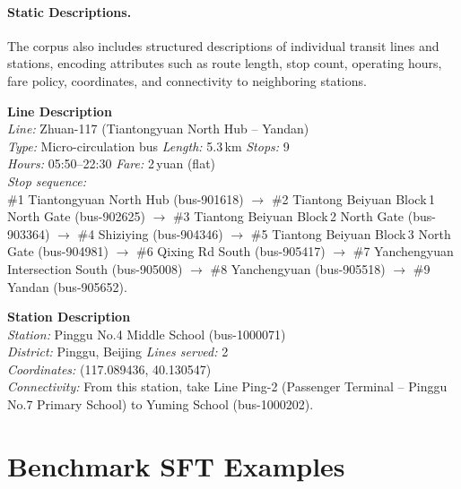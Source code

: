 \documentclass{llmxive}
\begin{document}
\paragraph{Static Descriptions.}
The corpus also includes structured descriptions of individual transit lines and stations, encoding attributes such as route length, stop count, operating hours, fare policy, coordinates, and connectivity to neighboring stations.

\begin{tcolorbox}[colback=gray!3, colframe=black!40, boxrule=0.4pt, arc=2pt, left=6pt, right=6pt, top=4pt, bottom=4pt, fontupper=\small, fontlower=\small, breakable, title={\small\textbf{CPT Static Descriptions}}]
\textbf{Line Description} \\[2pt]
\textit{Line:} Zhuan-117 (Tiantongyuan North Hub -- Yandan) \\
\textit{Type:} Micro-circulation bus \quad \textit{Length:} 5.3\,km \quad \textit{Stops:} 9 \\
\textit{Hours:} 05:50--22:30 \quad \textit{Fare:} 2\,yuan (flat) \\[2pt]
\textit{Stop sequence:} \\
\#1 Tiantongyuan North Hub (bus-901618) $\rightarrow$
\#2 Tiantong Beiyuan Block\,1 North Gate (bus-902625) $\rightarrow$
\#3 Tiantong Beiyuan Block\,2 North Gate (bus-903364) $\rightarrow$
\#4 Shiziying (bus-904346) $\rightarrow$
\#5 Tiantong Beiyuan Block\,3 North Gate (bus-904981) $\rightarrow$
\#6 Qixing Rd South (bus-905417) $\rightarrow$
\#7 Yanchengyuan Intersection South (bus-905008) $\rightarrow$
\#8 Yanchengyuan (bus-905518) $\rightarrow$
\#9 Yandan (bus-905652).

\tcblower

\textbf{Station Description} \\[2pt]
\textit{Station:} Pinggu No.4 Middle School (bus-1000071) \\
\textit{District:} Pinggu, Beijing \quad \textit{Lines served:} 2 \\
\textit{Coordinates:} (117.089436, 40.130547) \\[2pt]
\textit{Connectivity:} From this station, take Line Ping-2 (Passenger Terminal -- Pinggu No.7 Primary School) to Yuming School (bus-1000202).
\end{tcolorbox}

\section{Benchmark SFT Examples}
\label{app:benchmark_examples}
\end{document}

